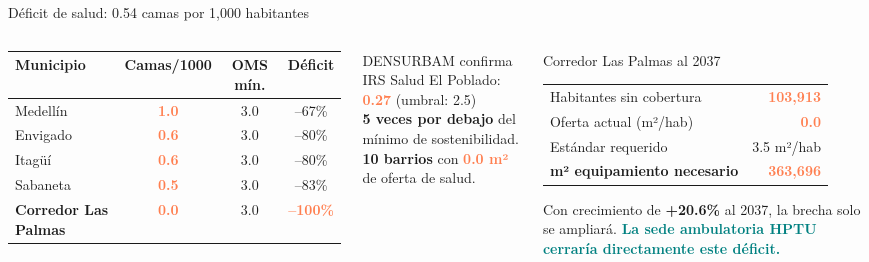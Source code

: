 \documentclass[aspectratio=169, 11pt]{beamer}
\newcommand{\highlight}[1]{\textcolor{teal}{\textbf{#1}}}
\newcommand{\danger}[1]{\textcolor{coral}{\textbf{#1}}}
\begin{document}
{
\begin{frame}{Déficit de salud: 0.54 camas por 1,000 habitantes}

\begin{columns}[T]
\vspace{-2pt}
{\scriptsize
\begin{tabular}{@{}lccc@{}}
\toprule
\textbf{Municipio} & \textbf{Camas/1000} & \textbf{OMS mín.} & \textbf{Déficit} \\
\midrule
\rowcolor{coral!10}
Medellín & \danger{1.0} & 3.0 & --67\% \\
\rowcolor{coral!10}
Envigado & \danger{0.6} & 3.0 & --80\% \\
\rowcolor{coral!10}
Itagüí & \danger{0.6} & 3.0 & --80\% \\
\rowcolor{coral!10}
Sabaneta & \danger{0.5} & 3.0 & --83\% \\
\midrule
\textbf{Corredor Las Palmas} & \danger{0.0} & 3.0 & \danger{--100\%} \\
\bottomrule
\end{tabular}
}

\vspace{4pt}
\begin{block}{\small DENSURBAM confirma}
\scriptsize
IRS Salud El Poblado: \danger{0.27} (umbral: 2.5)\\
\textbf{5 veces por debajo} del mínimo de sostenibilidad.\\
\textbf{10 barrios} con \danger{0.0 m²} de oferta de salud.
\end{block}

\begin{alertblock}{\small Corredor Las Palmas al 2037}
\footnotesize
\begin{tabular}{@{}lr@{}}
Habitantes sin cobertura & \danger{103,913} \\
Oferta actual (m²/hab) & \danger{0.0} \\
Estándar requerido & 3.5 m²/hab \\
\midrule
\textbf{m² equipamiento necesario} & \danger{363,696} \\
\end{tabular}

\vspace{3pt}
{\scriptsize Con crecimiento de \textbf{+20.6\%} al 2037, la brecha solo se ampliará. \highlight{La sede ambulatoria HPTU cerraría directamente este déficit.}}
\end{alertblock}


\end{columns}
\end{frame}}
\end{document}
